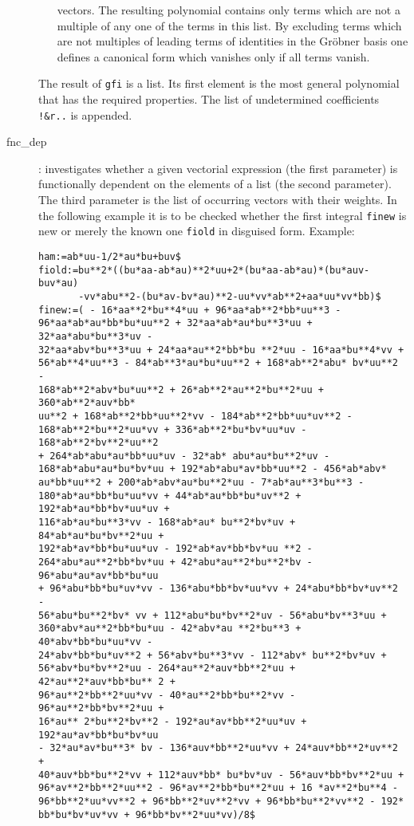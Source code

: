 \documentclass[12pt]{article}
\begin{document}
\begin{description}
\begin{enumerate}
                vectors. The resulting polynomial contains only terms
                which are not a multiple of any one of the terms in
                this list. By excluding terms which are not multiples
                of leading terms of identities in the Gr\"{o}bner
                basis one defines a canonical form which vanishes
                only if all terms vanish.
         \end{enumerate}
     The result of {\tt gfi} is a list.
     Its first element is the most general polynomial that has the required
     properties. The list of undetermined coefficients
     {\tt !\&r..} is appended.
  \item[fnc\_dep] : investigates whether a given
     vectorial expression (the first parameter) is
     functionally dependent on the elements of a list (the
     second parameter). The third parameter is the list of
     occurring vectors with their weights. In the following example it is to be
     checked whether the first integral {\tt finew} is new or merely the known
     one {\tt fiold} in disguised form. Example: \begin{verbatim}
ham:=ab*uu-1/2*au*bu+buv$
fiold:=bu**2*((bu*aa-ab*au)**2*uu+2*(bu*aa-ab*au)*(bu*auv-buv*au)
       -vv*abu**2-(bu*av-bv*au)**2-uu*vv*ab**2+aa*uu*vv*bb)$
finew:=( - 16*aa**2*bu**4*uu + 96*aa*ab**2*bb*uu**3 -
96*aa*ab*au*bb*bu*uu**2 + 32*aa*ab*au*bu**3*uu + 32*aa*abu*bu**3*uv -
32*aa*abv*bu**3*uu + 24*aa*au**2*bb*bu **2*uu - 16*aa*bu**4*vv +
56*ab**4*uu**3 - 84*ab**3*au*bu*uu**2 + 168*ab**2*abu* bv*uu**2 -
168*ab**2*abv*bu*uu**2 + 26*ab**2*au**2*bu**2*uu + 360*ab**2*auv*bb*
uu**2 + 168*ab**2*bb*uu**2*vv - 184*ab**2*bb*uu*uv**2 -
168*ab**2*bu**2*uu*vv + 336*ab**2*bu*bv*uu*uv - 168*ab**2*bv**2*uu**2
+ 264*ab*abu*au*bb*uu*uv - 32*ab* abu*au*bu**2*uv -
168*ab*abu*au*bu*bv*uu + 192*ab*abu*av*bb*uu**2 - 456*ab*abv*
au*bb*uu**2 + 200*ab*abv*au*bu**2*uu - 7*ab*au**3*bu**3 -
180*ab*au*bb*bu*uu*vv + 44*ab*au*bb*bu*uv**2 + 192*ab*au*bb*bv*uu*uv +
116*ab*au*bu**3*vv - 168*ab*au* bu**2*bv*uv + 84*ab*au*bu*bv**2*uu +
192*ab*av*bb*bu*uu*uv - 192*ab*av*bb*bv*uu **2 -
264*abu*au**2*bb*bv*uu + 42*abu*au**2*bu**2*bv - 96*abu*au*av*bb*bu*uu
+ 96*abu*bb*bu*uv*vv - 136*abu*bb*bv*uu*vv + 24*abu*bb*bv*uv**2 -
56*abu*bu**2*bv* vv + 112*abu*bu*bv**2*uv - 56*abu*bv**3*uu +
360*abv*au**2*bb*bu*uu - 42*abv*au **2*bu**3 + 40*abv*bb*bu*uu*vv -
24*abv*bb*bu*uv**2 + 56*abv*bu**3*vv - 112*abv* bu**2*bv*uv +
56*abv*bu*bv**2*uu - 264*au**2*auv*bb**2*uu + 42*au**2*auv*bb*bu** 2 +
96*au**2*bb**2*uu*vv - 40*au**2*bb*bu**2*vv - 96*au**2*bb*bv**2*uu +
16*au** 2*bu**2*bv**2 - 192*au*av*bb**2*uu*uv + 192*au*av*bb*bu*bv*uu
- 32*au*av*bu**3* bv - 136*auv*bb**2*uu*vv + 24*auv*bb**2*uv**2 +
40*auv*bb*bu**2*vv + 112*auv*bb* bu*bv*uv - 56*auv*bb*bv**2*uu +
96*av**2*bb**2*uu**2 - 96*av**2*bb*bu**2*uu + 16 *av**2*bu**4 -
96*bb**2*uu*vv**2 + 96*bb**2*uv**2*vv + 96*bb*bu**2*vv**2 - 192*
bb*bu*bv*uv*vv + 96*bb*bv**2*uu*vv)/8$


\end{verbatim}
\end{description}
\end{document}

